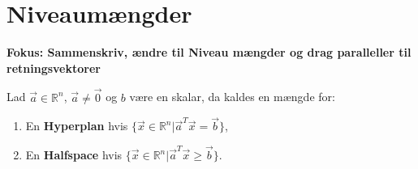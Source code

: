 \section{Niveaumængder}
\textbf{Fokus: Sammenskriv, ændre til Niveau mængder og drag paralleller til retningsvektorer}

\begin{defn}
Lad $ \vec{a} \in \mathds{R}^n$, $\vec{a}\neq \vec{0}$ og $b$ være en skalar, da kaldes en mængde for:
\begin{enumerate}
\item En \textbf{Hyperplan} hvis $\{ \vec{x} \in \mathds{R}^n | \vec{a}^{T}\vec{x} = \vec{b}\}$,
\\ \item En \textbf{Halfspace} hvis $\{ \vec{x} \in \mathds{R}^n | \vec{a}^{T} \vec{x} \geq \vec{b}\}$.
\end{enumerate}
\end{defn}


